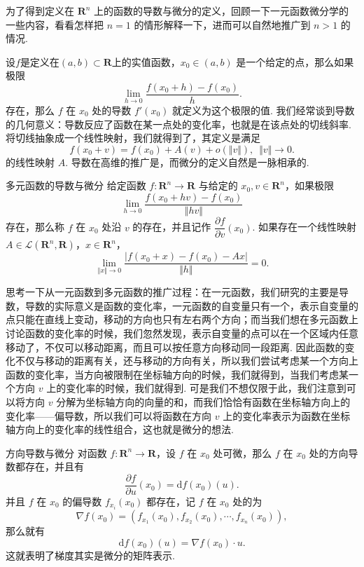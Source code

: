 为了得到定义在 $\mathbf{R}^n$ 上的函数的导数与微分的定义，回顾一下一元函数微分学的一些内容，看看怎样把 $n=1$ 的情形解释一下，进而可以自然地推广到 $n>1$ 的情况.

设$f$是定义在$(a,b)\subset \mathbf{R}$上的实值函数，$x_0\in (a,b)$ 是一个给定的点，那么如果极限 \[\lim_{h\to 0}\frac{f(x_0 + h)-f(x_0)}{h}.\]
存在，那么 $f$ 在 $x_0$ 处的导数 $f'(x_0)$ 就定义为这个极限的值. 我们经常谈到导数的几何意义：导数反应了函数在某一点处的变化率，也就是在该点处的切线斜率. 将切线抽象成一个线性映射，我们就得到了，其定义是满足 \[f(x_0 + v) = f(x_0) + A(v) + o(\Vert v\Vert),\enspace \Vert v\Vert\to 0.\]
的线性映射 $A$. 导数在高维的推广是，而微分的定义自然是一脉相承的.

\begin{definition}{多元函数的导数与微分}{}
    给定函数 $f: \mathbf{R}^n\to\mathbf{R}$ 与给定的 $x_0, v\in\mathbf{R}^n$，如果极限 \[\lim_{h\to 0}\frac{f(x_0 + hv) - f(x_0)}{\Vert hv\Vert}\] 存在，那么称 $f$ 在 $x_0$ 处沿 $v$ 的存在，并且记作 $\dfrac{\partial f}{\partial v}(x_0)$. 如果存在一个线性映射 $A\in \mathcal{L}(\mathbf{R}^n, \mathbf{R})$，$x\in \mathbf{R}^n$，
    \[\lim\limits_{\Vert x \Vert \to0}\frac{\vert f(x_0 + x) - f(x_0) - Ax \vert}{\Vert h \Vert} = 0.\]

\end{definition}

思考一下从一元函数到多元函数的推广过程：在一元函数，我们研究的主要是导数，导数的实际意义是函数的变化率，一元函数的自变量只有一个，表示自变量的点只能在直线上变动，移动的方向也只有左右两个方向；而当我们想在多元函数上讨论函数的变化率的时候，我们忽然发现，表示自变量的点可以在一个区域内任意移动了，不仅可以移动距离，而且可以按任意方向移动同一段距离. 因此函数的变化不仅与移动的距离有关，还与移动的方向有关，所以我们尝试考虑某一个方向上函数的变化率，当方向被限制在坐标轴方向的时候，我们就得到，当我们考虑某一个方向 $v$ 上的变化率的时候，我们就得到. 可是我们不想仅限于此，我们注意到可以将方向 $v$ 分解为坐标轴方向的向量的和，而我们恰恰有函数在坐标轴方向上的变化率——偏导数，所以我们可以将函数在方向 $v$ 上的变化率表示为函数在坐标轴方向上的变化率的线性组合，这也就是微分的想法.

\begin{theorem}{方向导数与微分}{}
    对函数 $f: \mathbf{R}^n\to \mathbf{R}$，设 $f$ 在 $x_0$ 处可微，那么 $f$ 在 $x_0$ 处的方向导数都存在，并且有\[\frac{\partial f}{\partial u}(x_0) = \mathrm{d}f(x_0)(u).\]
    并且 $f$ 在 $x_0$ 的偏导数 $f_{x_i}(x_0)$ 都存在，记 $f$ 在 $x_0$ 处的为 \[\nabla f(x_0) = (f_{x_1}(x_0), f_{x_2}(x_0), \cdots, f_{x_n}(x_0)),\]
    那么就有 \[\mathrm{d}f(x_0)(u) = \nabla f(x_0)\cdot u.\]这就表明了\textrm{梯度其实是微分的矩阵表示}.
\end{theorem}

